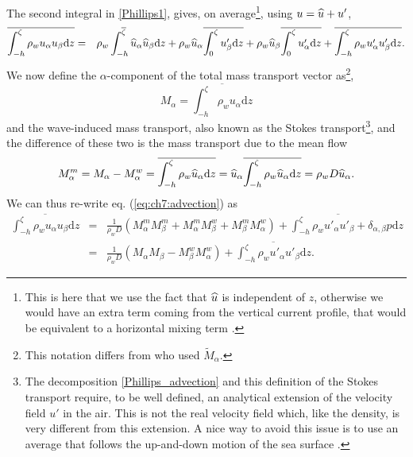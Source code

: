 The second integral in \ref{Phillips1}, gives, on average\footnote{This is here that we use the fact that  $\widehat{u}$ is independent of  
$z$, otherwise we would have an extra term coming from the vertical current profile, 
that would be equivalent to a horizontal mixing term \citep{Svendsen&Putrevu1994}.}, using  $u=\widehat{u}+u'$, 
\begin{eqnarray}
\overline{ \int_{-h}^{\zeta}   \rho_w u_\alpha u_\beta \mathrm{d} z } &= & \rho_w  \int_{-h}^{\overline{\zeta}} \widehat{u}_\alpha \widehat{u}_\beta   \mathrm{d} z
 +   \rho_w \widehat{u}_\alpha \overline{ \int_{0}^{\zeta} u'_\beta \mathrm{d} z } + \rho_w \widehat{u}_\beta \overline{ \int_{0}^{\zeta} u'_\alpha \mathrm{d} z }
 + \overline{ \int_{-h}^{\zeta} \rho_w u'_\alpha u'_\beta 
\mathrm{d} z}.\label{eq:ch7:advection}
\end{eqnarray}
We now define the $\alpha$-component of the total mass transport vector as\footnote{This notation 
differs from \cite{Phillips1977} who used $\widetilde{M}_\alpha$.}, 
\begin{equation}
M_\alpha = \overline{ \int_{-h}^{\zeta}   \rho_w u_\alpha \mathrm{d} z } 
\end{equation}
and the wave-induced mass transport, also known as the Stokes transport\footnote{The decomposition \ref{Phillips_advection} 
and this definition of the Stokes transport require, to be well defined, an analytical extension of the velocity field  $u'$ in the air. 
This is not the real velocity field which, like the density, is very different from this extension. A nice way to avoid this issue is to use an average
that follows the up-and-down motion of the sea surface \citep[e.g.][]{Ardhuin&al.2008b}.}, 
and the difference of these two is the mass transport due to the mean flow
\begin{equation}
M_\alpha^m = M_\alpha - M_\alpha^w = \overline{ \int_{-h}^{\zeta}   \rho_w \widehat{u}_\alpha \mathrm{d} z } =\widehat{u}_\alpha  \overline{ \int_{-h}^{\zeta}   \rho_w \widehat{u}_\alpha \mathrm{d} z} = \rho_w D \widehat{u}_\alpha.
\end{equation}
We can thus re-write  eq. (\ref{eq:ch7:advection}) as 
\begin{eqnarray}
\overline{ \int_{-h}^{\zeta}   \rho_w u_\alpha u_\beta \mathrm{d} z }   & = & \frac{1}{\rho_w D} \left(M_\alpha^m M_\beta^m + M_\alpha^m M_\beta^w  + M_\beta^m M_\alpha^w\right) + \overline{ \int_{-h}^{\zeta} \rho_w u'_\alpha u'_\beta 
+\delta_{\alpha,\beta}} p\mathrm{d} z  \\
& = & \frac{1}{\rho_w D} \left(M_\alpha M_\beta - M_\beta^w M_\alpha^w\right) + \overline{ \int_{-h}^{\zeta} \rho_w u'_\alpha u'_\beta 
\mathrm{d} z}. \label{Phillips_advection}
\end{eqnarray}

